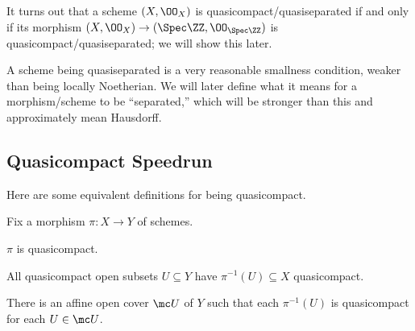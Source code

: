 \documentclass[../notes.tex]{subfiles}
\begin{document}
It turns out that a scheme $(X,\OO_X)$ is quasicompact/quasiseparated if and only if its morphism $(X,\OO_X)\to(\Spec\ZZ,\OO_{\Spec\ZZ})$ is quasicompact/quasiseparated; we will show this later.
\begin{remark}
	A scheme being quasiseparated is a very reasonable smallness condition, weaker than being locally Noetherian. We will later define what it means for a morphism/scheme to be ``separated,'' which will be stronger than this and approximately mean Hausdorff.
\end{remark}

\subsection{Quasicompact Speedrun}
Here are some equivalent definitions for being quasicompact.
\begin{lemma} \label{lem:mainqclemma}
	Fix a morphism $\pi\colon X\to Y$ of schemes.
	\begin{listalph}
		\item $\pi$ is quasicompact.
		\item All quasicompact open subsets $U\subseteq Y$ have $\pi^{-1}(U)\subseteq X$ quasicompact.
		\item There is an affine open cover $\mc U$ of $Y$ such that each $\pi^{-1}(U)$ is quasicompact for each $U\in\mc U$.
	\end{listalph}
\end{lemma}
\end{document}
